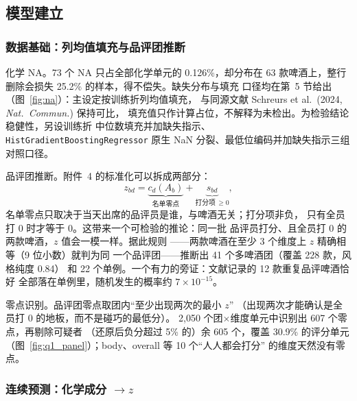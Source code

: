 \documentclass[12pt,a4paper]{article}
\begin{document}
\subsection{模型建立}

\subsubsection{数据基础：列均值填充与品评团推断}

化学 NA。73 个 NA 只占全部化学单元的 0.126\%，却分布在
63 款啤酒上，整行删除会损失 25.2\% 的样本，得不偿失。缺失分布与填充
口径均在第~5 节给出（图~\ref{fig:na}）：主设定按训练折列均值填充，
与同源文献 Schreurs et al.\ (2024, \textit{Nat.\ Commun.}) 保持可比，
填充值只作计算占位，不解释为未检出。为检验结论稳健性，另设训练折
中位数填充并加缺失指示、\texttt{HistGradientBoostingRegressor} 原生
NaN 分裂、最低位编码并加缺失指示三组对照口径。

品评团推断。附件~4 的标准化可以拆成两部分：
\begin{equation}
  z_{bd}=\underbrace{c_d(A_b)}_{\text{名单零点}}
  +\underbrace{s_{bd}}_{\text{打分项}\,\ge 0},
\end{equation}
名单零点只取决于当天出席的品评员是谁，与啤酒无关；打分项非负，
只有全员打 0 时才等于 0。这带来一个可检验的推论：同一批
品评员打分、且全员打 0 的两款啤酒，$z$ 值会一模一样。据此规则
——两款啤酒在至少 3 个维度上 $z$ 精确相等（9 位小数）就判为同
一个品评团——推断出 41 个多啤酒团（覆盖 228 款，风格纯度 0.84）
和 22 个单例。一个有力的旁证：文献记录的 12 款重复品评啤酒恰好
全部落在单例里，随机发生的概率约 $7\times10^{-15}$。

零点识别。品评团零点取团内``至少出现两次的最小 $z$''
（出现两次才能确认是全员打 0 的地板，而不是碰巧的最低分）。
2{,}050 个团$\times$维度单元中识别出 607 个零点，再剔除可疑者
（还原后负分超过 5\% 的）余 605 个，覆盖 30.9\% 的评分单元
（图~\ref{fig:q1_panel}）；body、overall 等 10 个``人人都会打分''
的维度天然没有零点。


\subsubsection{连续预测：化学成分 $\to z$}
\end{document}
